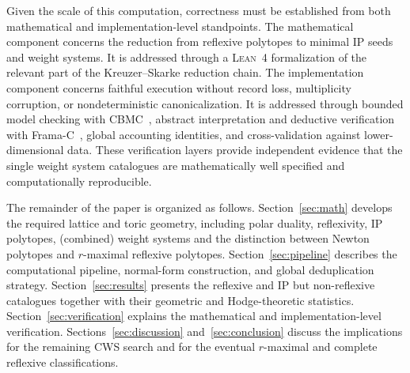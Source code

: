 \documentclass[appliedmath,article,submit,moreauthors]{Definitions/mdpi}
\newcommand{\Lean}{\textsc{Lean}}
\begin{document}
Given the scale of this computation, correctness must be established from both
mathematical and implementation-level standpoints. The mathematical component
concerns the reduction from reflexive polytopes to minimal IP seeds and weight
systems. It is addressed through a \Lean~4 formalization of the relevant part of
the Kreuzer--Skarke reduction chain. The implementation component concerns
faithful execution without record loss, multiplicity corruption, or
nondeterministic canonicalization. It is addressed through bounded model
checking with CBMC~\cite{CBMC}, abstract interpretation and deductive
verification with Frama-C~\cite{FramaC}, global accounting identities, and
cross-validation against lower-dimensional data. These verification layers
provide independent evidence that the single weight system catalogues are
mathematically well specified and computationally reproducible.

The remainder of the paper is organized as follows. Section~\ref{sec:math}
develops the required lattice and toric geometry, including polar duality,
reflexivity, IP polytopes, (combined) weight systems and the distinction between
Newton polytopes and \(r\)-maximal reflexive polytopes.
Section~\ref{sec:pipeline} describes the computational pipeline, normal-form
construction, and global deduplication strategy. Section~\ref{sec:results}
presents the reflexive and IP but non-reflexive catalogues together with their
geometric and Hodge-theoretic statistics. Section~\ref{sec:verification}
explains the mathematical and implementation-level verification.
Sections~\ref{sec:discussion} and~\ref{sec:conclusion} discuss the implications
for the remaining CWS search and for the eventual \(r\)-maximal and complete
reflexive classifications.
\end{document}

